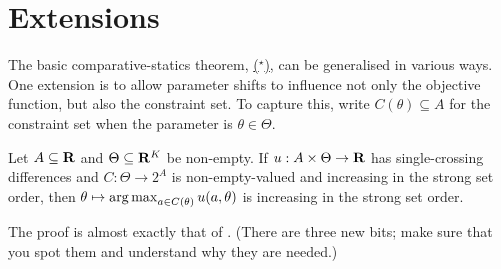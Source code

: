 \section{Extensions}
\label{mcs:ext}

The basic comparative-statics theorem, \hyperref[theorem:topkis_ms_converse]{($^\star$)}, can be generalised in various ways. One extension is to allow parameter shifts to influence not only the objective function, but also the constraint set. To capture this, write $C(\theta) \subseteq A$ for the constraint set when the parameter is $\theta \in \Theta$.

\begin{proposition}
	\label{proposition:topkis_constr}
	Let $A \subseteq \mathbf{R}$ and $\Theta \subseteq \mathbf{R}^K$ be non-empty. If $u : A \times \Theta \to \mathbf{R}$ has single-crossing differences and $C : \Theta \to 2^A$ is non-empty-valued and increasing in the strong set order, then $\theta \mapsto \operatorname*{arg\,max}_{a \in C(\theta)} u(a,\theta)$ is increasing in the strong set order.
\end{proposition}

The proof is almost exactly that of . (There are three new bits; make sure that you spot them and understand why they are needed.)

